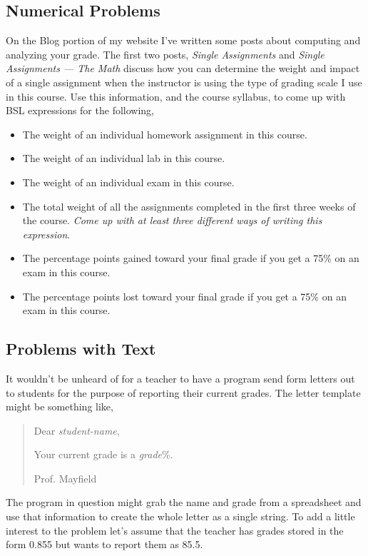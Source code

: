 \documentclass[nobib]{tufte-handout}
\begin{document}
\subsection{Numerical Problems}

On the Blog portion of my website I've written some posts about computing and analyzing your grade. The first two posts, \textit{Single Assignments} and \textit{Single Assignments --- The Math} discuss how you can determine the weight and impact of a single assignment when the instructor is using the type of grading scale I use in this course. Use this information, and the course syllabus, to come up with BSL expressions for the following,
\begin{itemize}
  \item The weight of an individual homework assignment in this course.
  \item The weight of an individual lab in this course.
  \item The weight of an individual exam in this course.
  \item The total weight of all the assignments completed in the first three weeks of the course. \textit{Come up with at least three different ways of writing this expression}.
  \item The percentage points gained toward your final grade if you get a 75\% on an exam in this course.
  \item The percentage points lost toward your final grade if you get a 75\% on an exam in this course.
\end{itemize}

\subsection{Problems with Text}

It wouldn't be unheard of for a teacher to have a program send form letters out to students for the purpose of reporting their current grades. The letter template might be something like,

\begin{quote}
  Dear \textit{student-name},

  Your current grade is a \textit{grade}\%.

  Prof. Mayfield
\end{quote}

The program in question might grab the name and grade from a spreadsheet and use that information to create the whole letter as a single string. To add a little interest to the problem let's assume that the teacher has grades stored in the form 0.855 but wants to report them as 85.5.
\end{document}
